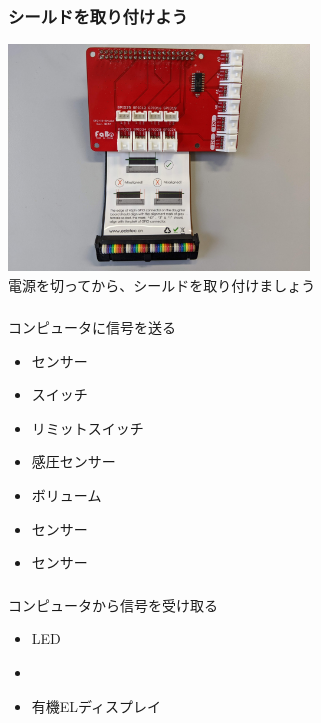 \begin{frame}
    \frametitle{シールドを取り付けよう}
    \begin{center}
        \includegraphics[width=0.6\textwidth]{images/chap05/fabo_and_cable.jpg}
        {\\\color{red}電源を切ってから\color{black}、シールドを取り付けましょう}
    \end{center}
\end{frame}

\begin{frame}
    \frametitle{}
    \begin{center}
        {コンピュータに信号を送る}
        \begin{itemize}
            \item {}センサー
            \item スイッチ
            \item リミットスイッチ
            \item 感圧センサー
            \item ボリューム
            \item {}センサー
            \item {}センサー 
        \end{itemize}
    \end{center}
\end{frame}

\begin{frame}
    \frametitle{}
    \begin{center}
        {コンピュータから信号を受け取る}
        \begin{itemize}
            \item LED
            \item {}
            \item 有機ELディスプレイ
        \end{itemize}
    \end{center}
\end{frame}

